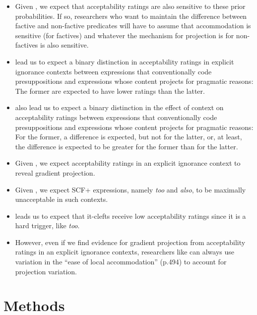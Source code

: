 \documentclass[11pt,fleqn]{article}
\newcommand{\6}{\mbox{$[\hspace*{-.6mm}[$}}
\newcommand{\9}{\mbox{$]\hspace*{-.6mm}]$}}
\begin{document}
\begin{itemize}
\item Given \citealt{degen-tonhauser-openmind}, we expect that acceptability ratings are also sensitive to these prior probabilities. If so, researchers who want to maintain the difference between factive and non-factive predicates will have to assume that accommodation is sensitive (for factives) and whatever the mechanism for projection is for non-factives is also sensitive.

\item \citealt{mandelkern-etal2020} lead us to expect a binary distinction in acceptability ratings in explicit ignorance contexts between expressions that conventionally code presuppositions and expressions whose content projects for pragmatic reasons: The former are expected to have lower ratings than the latter.

\item \citealt{mandelkern-etal2020} also lead us to expect a binary distinction in the effect of context on acceptability ratings between expressions that conventionally code presuppositions and expressions whose content projects for pragmatic reasons: For the former, a difference is expected, but not for the latter, or, at least, the difference is expected to be greater for the former than for the latter. 

\item Given \citealt{degen-tonhauser-openmind,degen-tonhauser-language}, we expect acceptability ratings in an explicit ignorance context to  reveal gradient projection. 

\item Given \citealt{brst-lang11}, we expect SCF+ expressions, namely {\em too} and {\em also}, to be maximally unacceptable in such contexts.

\item \citealt{abusch10} leads us to expect that it-clefts receive low acceptability ratings since it is a hard trigger, like {\em too}.

\item However, even if we find evidence for gradient projection from acceptability ratings in an explicit ignorance contexts, researchers like \citealt{mandelkern-etal2020} can always use variation in the ``ease of local accommodation'' (p.494) to account for projection variation. 

\end{itemize}


\section{Methods}\label{s-methods}
\end{document}
